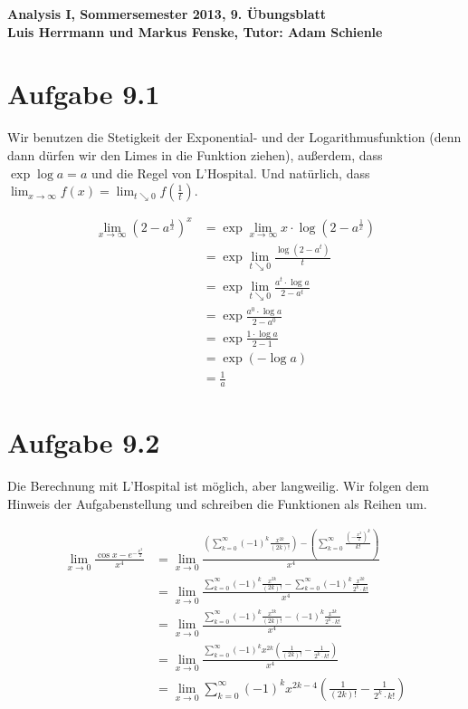 \documentclass[a4paper,german,12pt,smallheadings]{scrartcl}
\begin{document}
\begin{center}
\bfseries %
\sffamily %
\vspace{-40pt}
Analysis I, Sommersemester 2013, 9. Übungsblatt \\
Luis Herrmann und Markus Fenske, Tutor: Adam Schienle
\vspace{-10pt}
\end{center}

\section*{Aufgabe 9.1}

Wir benutzen die Stetigkeit der Exponential- und der Logarithmusfunktion (denn
dann dürfen wir den Limes in die Funktion ziehen), außerdem, dass $\exp \log a
= a$ und die Regel von L'Hospital. Und natürlich, dass $\lim_{x \to \infty}
f(x) = \lim_{t \searrow 0} f\left(\frac{1}{t}\right)$.

\begin{align*}
  \lim_{x \to \infty} \left(2-a^\frac{1}{x}\right)^x &= \exp \lim_{x \to \infty} x \cdot \log \left(2-a^\frac{1}{x}\right) \\
  &= \exp \lim_{t \searrow 0} \frac{\log (2-a^t)}{t} \\
  &= \exp \lim_{t \searrow 0} \frac{a^t \cdot \log a}{2-a^t} \\
  &= \exp \frac{a^0 \cdot \log a}{2-a^0} \\
  &= \exp \frac{1 \cdot \log a}{2-1} \\
  &= \exp (-\log a) \\
  &= \frac{1}{a}
\end{align*}

\section*{Aufgabe 9.2}

Die Berechnung mit L'Hospital ist möglich, aber langweilig. Wir folgen dem
Hinweis der Aufgabenstellung und schreiben die Funktionen als Reihen um.

\begin{align*}
  \lim_{x \to 0} \frac{\cos x - e^{-\frac{x^2}{2}}}{x^4} &= \lim_{x \to 0} \frac{\left(\sum_{k=0}^\infty (-1)^k \frac{x^{2k}}{(2k)!}\right) - \left(\sum_{k=0}^{\infty} \frac{\left(-\frac{x^2}{2}\right)^k}{k!} \right)}{x^4} \\
   &= \lim_{x \to 0} \frac{\sum_{k=0}^\infty (-1)^k \frac{x^{2k}}{(2k)!} - \sum_{k=0}^{\infty} (-1)^k \frac{x^{2k}}{2^k \cdot k!}}{x^4} \\
   &= \lim_{x \to 0} \frac{\sum_{k=0}^\infty (-1)^k \frac{x^{2k}}{(2k)!} - (-1)^k \frac{x^{2k}}{2^k \cdot k!}}{x^4} \\
   &= \lim_{x \to 0} \frac{\sum_{k=0}^\infty (-1)^k x^{2k} \left(\frac{1}{(2k)!} - \frac{1}{2^k \cdot k!}\right)}{x^4} \\
   &= \lim_{x \to 0} \sum_{k=0}^\infty (-1)^k x^{2k-4} \left(\frac{1}{(2k)!} - \frac{1}{2^k \cdot k!}\right) \\
\end{align*}
\end{document}
